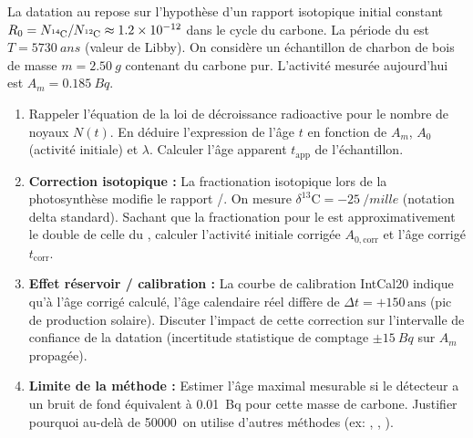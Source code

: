 \documentclass[11pt]{article}
\begin{document}
\begin{exercice}
La datation au  repose sur l'hypothèse d'un rapport isotopique initial constant $R_0 = N_{\ce{^{14}C}}/N_{\ce{^{12}C}} \approx \SI{1,2e-12}{}$ dans le cycle du carbone. La période du  est $T = \SI{5730}{ans}$ (valeur de Libby). On considère un échantillon de charbon de bois de masse $m = \SI{2,50}{g}$ contenant du carbone pur. L'activité mesurée aujourd'hui est $A_m = \SI{0,185}{Bq}$.
\begin{enumerate}
    \item Rappeler l'équation de la loi de décroissance radioactive pour le nombre de noyaux $N(t)$. En déduire l'expression de l'âge $t$ en fonction de $A_m$, $A_0$ (activité initiale) et $\lambda$. Calculer l'âge apparent $t_{\text{app}}$ de l'échantillon.
    \item \textbf{Correction isotopique :} La fractionation isotopique lors de la photosynthèse modifie le rapport /. On mesure $\delta^{13}\mathrm{C} = \SI{-25}{\per mille}$ (notation delta standard). Sachant que la fractionation pour le  est approximativement le double de celle du , calculer l'activité initiale corrigée $A_{0,\text{corr}}$ et l'âge corrigé $t_{\text{corr}}$.
    \item \textbf{Effet réservoir / calibration :} La courbe de calibration IntCal20 indique qu'à l'âge corrigé calculé, l'âge calendaire réel diffère de $\Delta t = +150\,\text{ans}$ (pic de production solaire). Discuter l'impact de cette correction sur l'intervalle de confiance de la datation (incertitude statistique de comptage $\pm \SI{15}{Bq}$ sur $A_m$ propagée).
    \item \textbf{Limite de la méthode :} Estimer l'âge maximal mesurable si le détecteur a un bruit de fond équivalent à \SI{0,01}{Bq} pour cette masse de carbone. Justifier pourquoi au-delà de \num{50000}\, on utilise d'autres méthodes (ex: , , ).
\end{enumerate}
\end{exercice}
\end{document}
